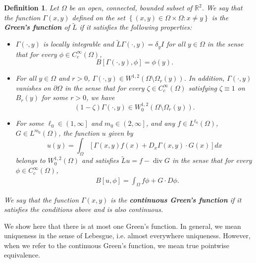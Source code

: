 \documentclass[12pt,reqno]{amsart}
\theoremstyle{plain}
\newtheorem{defn}{Definition}
\theoremstyle{definition}
\DeclareMathOperator{\di}{div}
\newcommand{\de}{\delta}
\newcommand{\Ga}{\Gamma}
\newcommand{\Om}{\Omega}
\newcommand{\iny}{\infty}
\newcommand{\set}[1]{\left\{#1\right\}}
\newcommand{\brac}[1]{\left[#1\right]}
\newcommand{\pr}[1]{\left( #1 \right) }
\newcommand{\pb}[1]{\left( #1 \right] }
\newcommand{\R}{\ensuremath{\mathbb{R}}}
\begin{document}
\begin{appendix}
\begin{defn} 
Let $\Omega$ be an open, connected, bounded subset of $\R^2$.
We say that the function $\Ga\pr{x,y}$ defined on the set $\set{(x,y)\in \Omega \times \Omega: x\ne y}$ is the \textbf{Green's function} of $\widetilde{L}$ if it satisfies the following properties:
\begin{itemize}
\item[1)] $\Ga\pr{\cdot, y}$ is locally integrable and $\widetilde{L}\Ga\pr{\cdot, y} = \de_y I$ for all $y \in \Omega$ in the sense that for every $\phi \in C^\iny_c\pr{\Omega}$,
\begin{equation}
B\brac{\Ga\pr{\cdot, y}, \phi} = \phi\pr{y}.
\label{eqB.12}
\end{equation}
\item[2)] For all $y\in \Om$ and $r > 0$, $\Ga\pr{\cdot, y}\in W^{1,2}\pr{\Om \setminus  \Omega_r\pr{y}}$.  
In addition, $\Ga(\cdot,  y)$ vanishes on $\partial \Omega$ in the sense that for every $\zeta \in C_c^\infty\pr{\Om}$ satisfying $\zeta \equiv 1$ on $B_r(y)$ for some $r>0$, we have
\begin{equation}
(1-\zeta)\Ga(\cdot, y) \in W_0^{1,2}\pr{\Om \setminus \Omega_r(y)}.
\label{eqB.13}
\end{equation}
\item[3)] For some $\ell_0 \in \pb{1, \iny}$ and $m_0 \in \pb{2, \iny}$, and any $f \in L^{\ell_0}\pr{\Om}$, $G \in L^{m_0}\pr{\Om}$, the function $u$ given by
\begin{equation}
u\pr{y} = \int_{\Om} \brac{ \Ga\pr{x,y} f\pr{x} + D_x \Ga\pr{x, y} \cdot G\pr{x} } dx
\label{eqB.14}
\end{equation}
belongs to $W^{1,2}_0\pr{\Om}$ and satisfies $\widetilde{L}u = f - \di G$ in the sense that for every $\phi  \in C^\iny_c\pr{\Om}$,
\begin{align}
&B\brac{u, \phi}
= \int_{\Om} f \phi + G \cdot D \phi.
\label{eqB.15}
\end{align}
\end{itemize}
We say that the function $\Ga\pr{x,y}$ is the \textbf{continuous Green's function} if it satisfies the conditions above and is also continuous.
\label{d3.1}
\end{defn}

We show here that there is at most one Green's function.  
In general, we mean uniqueness in the sense of Lebesgue, i.e. almost everywhere uniqueness.
However, when we refer to the continuous Green's function, we mean true pointwise equivalence.


\end{appendix}
\end{document}
